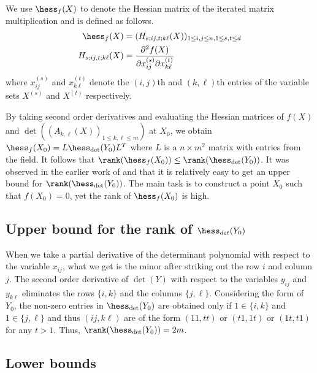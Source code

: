 We use $\hess_{f}(X)$ to denote the Hessian matrix of the iterated matrix multiplication and is defined as follows.
\begin{align*}
  \hess_{f}(X) &= (H_{s;ij,t;k\ell}(X))_{1\leq i,j\leq n, 1\leq s,t \leq d }\\
  H_{s;ij,t;k\ell}(X) &= \frac{\partial^2f(X)}{\partial x_{ij}^{(s)}\partial x_{k\ell}^{(t)}}
\end{align*}
where $x_{ij}^{(s)}$ and $x_{k\ell}^{(t)}$  denote the $(i,j)$th and $(k,\ell)$th entries of the variable sets $X^{(s)}$ and $X^{(t)}$ respectively. 

By taking second order derivatives and evaluating the Hessian matrices of $f(X)$ and $\det((A_{k,\ell}(X))_{1\leq k,\ell\leq m})$ at $X_0$, we obtain $\hess_{f}(X_0) = L\hess_{\det}(Y_0)L^{T}$ where $L$ is a $n\times m^2$ matrix with entries from the field. It follows that $\rank(\hess_{f}(X_0)) \leq \rank(\hess_{\det}(Y_0))$. It was observed in the earlier work  of \cite{mr04} and \cite{ccl2008} that it is relatively easy to get an upper bound for $\rank(\hess_{\det}(Y_0))$. 
The main task is to construct a point $X_0$ such that $f(X_0)=0$, yet the rank of $\hess_{f}(X_0)$ is high. 

\subsection{Upper bound for the rank of $\hess_{det}(Y_0)$}

 When we take a  partial derivative of the determinant polynomial with respect to the variable $x_{ij}$, what we get is the minor after striking out the row $i$ and column $j$. 
 The second order derivative of $\det(Y)$ with respect to the variables $y_{ij}$ and $y_{k\ell}$ eliminates the rows $\{i,k\}$ and the columns $\{j,\ell\}$. Considering the form of $Y_0$, the non-zero entries in $\hess_{\det}(Y_0)$ are obtained only if $1\in\{i,k\}$ and $1\in\{j,\ell\}$ and thus $(ij,k\ell)$ are of the form $(11,tt)$ or $(t1,1t)$ or $(1t,t1)$ for any $t>1$. Thus, $\rank(\hess_{\det}(Y_0)) = 2m$.
 
\subsection{Lower bounds}

